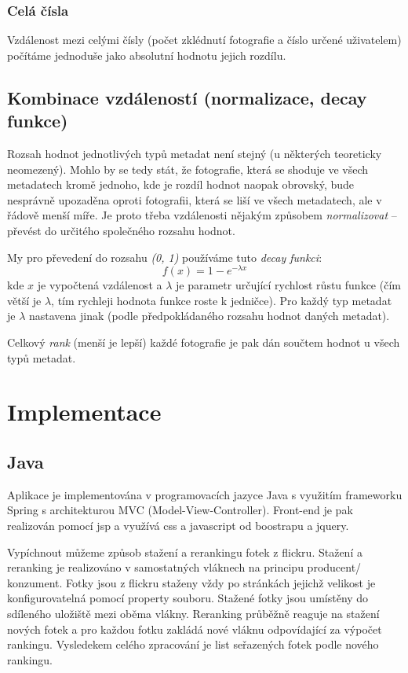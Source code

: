 \documentclass[12pt,oneside,a4paper]{article}
\begin{document}
\subsubsection{Celá čísla}
Vzdálenost mezi celými čísly (počet zklédnutí fotografie a číslo určené uživatelem) počítáme jednoduše jako absolutní hodnotu jejich rozdílu.

\subsection{Kombinace vzdáleností (normalizace, decay funkce)}
Rozsah hodnot jednotlivých typů metadat není stejný (u některých teoreticky neomezený). Mohlo by se tedy stát, že fotografie, která se shoduje ve všech metadatech kromě jednoho, kde je rozdíl hodnot naopak obrovský, bude nesprávně upozaděna oproti fotografii, která se liší ve všech metadatech, ale v řádově menší míře. Je proto třeba vzdálenosti nějakým způsobem \textit{normalizovat} -- převést do určitého společného rozsahu hodnot.

My pro převedení do rozsahu \textit{(0, 1)} používáme tuto \textit{decay funkci}:
\begin{equation}
	f(x) = 1 - e^{-\lambda x}
\end{equation}
kde \(x\) je vypočtená vzdálenost a \(\lambda\) je parametr určující rychlost růstu funkce (čím větší je \(\lambda\), tím rychleji hodnota funkce roste k jedničce). Pro každý typ metadat je \(\lambda\) nastavena jinak (podle předpokládaného rozsahu hodnot daných metadat).

Celkový \textit{rank} (menší je lepší) každé fotografie je pak dán součtem hodnot u všech typů metadat.

\section{Implementace}

\subsection{Java}

Aplikace je implementována v programovacích jazyce Java s využitím frameworku Spring s architekturou MVC (Model-View-Controller).
Front-end je pak realizován pomocí jsp a využívá css a javascript od boostrapu a jquery.

Vypíchnout můžeme způsob stažení a rerankingu fotek z flickru. Stažení a reranking je realizováno v samostatných vláknech na principu producent/ konzument. Fotky jsou z flickru staženy vždy po stránkách jejichž velikost je konfigurovatelná pomocí property souboru. Stažené fotky jsou umístěny do sdíleného uložiště mezi oběma vlákny. Reranking průběžně reaguje na stažení nových fotek a pro každou fotku zakládá nové vláknu odpovídající za výpočet rankingu. Vysledekem celého zpracování je list seřazených fotek podle nového rankingu.
\end{document}

